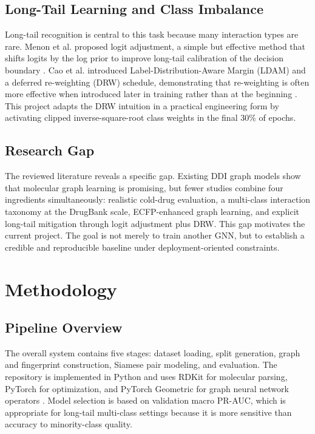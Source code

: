 \documentclass[12pt,a4paper]{report}
\begin{document}
\section{Long-Tail Learning and Class Imbalance}
Long-tail recognition is central to this task because many interaction types are rare. Menon et al. proposed logit adjustment, a simple but effective method that shifts logits by the log prior to improve long-tail calibration of the decision boundary \cite{menon2021logit}. Cao et al. introduced Label-Distribution-Aware Margin (LDAM) and a deferred re-weighting (DRW) schedule, demonstrating that re-weighting is often more effective when introduced later in training rather than at the beginning \cite{cao2019ldam}. This project adapts the DRW intuition in a practical engineering form by activating clipped inverse-square-root class weights in the final 30\% of epochs.

\section{Research Gap}
The reviewed literature reveals a specific gap. Existing DDI graph models show that molecular graph learning is promising, but fewer studies combine four ingredients simultaneously: realistic cold-drug evaluation, a multi-class interaction taxonomy at the DrugBank scale, ECFP-enhanced graph learning, and explicit long-tail mitigation through logit adjustment plus DRW. This gap motivates the current project. The goal is not merely to train another GNN, but to establish a credible and reproducible baseline under deployment-oriented constraints.

\chapter{Methodology}
\section{Pipeline Overview}
The overall system contains five stages: dataset loading, split generation, graph and fingerprint construction, Siamese pair modeling, and evaluation. The repository is implemented in Python and uses RDKit for molecular parsing, PyTorch for optimization, and PyTorch Geometric for graph neural network operators \cite{fey2019pyg}. Model selection is based on validation macro PR-AUC, which is appropriate for long-tail multi-class settings because it is more sensitive than accuracy to minority-class quality.
\end{document}
